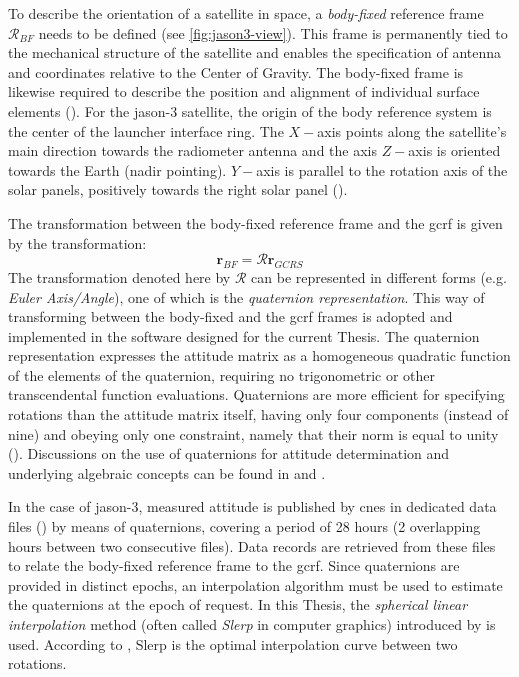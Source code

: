 To describe the orientation of a satellite in space, a \emph{body-fixed} reference 
frame $\mathcal{R}_{BF}$ needs to be defined (see \autoref{fig:jason3-view}). 
This frame is permanently tied to the mechanical 
structure of the satellite and enables the specification of antenna and coordinates 
relative to the Center of Gravity. The body-fixed frame is likewise required to describe the 
position and alignment of individual surface elements (\cite{Montenbruck2015}).
For the \gls{jason}-3 satellite, the origin of the body reference system is the center of the launcher interface ring. 
The $X-$axis points along the satellite's main direction towards the radiometer 
antenna and the axis $Z-$axis is oriented towards the Earth (nadir pointing). 
$Y-$axis is parallel to the rotation axis of the solar panels, positively 
towards the right solar panel (\cite{Zeitlhofler2019}).

The transformation between the body-fixed reference frame and the \gls{gcrf} is 
given by the transformation:
\begin{equation}
  \bm{r}_{BF} = \mathcal{R} \bm{r}_{GCRS}
\end{equation}
The transformation denoted here by $\mathcal{R}$ can be represented in different 
forms (e.g. \emph{Euler Axis/Angle}), one of which is the 
\emph{quaternion representation}. This way of transforming between the body-fixed 
and the \gls{gcrf} frames is adopted and implemented in the software designed for 
the current Thesis. The quaternion representation expresses the attitude matrix as 
a homogeneous quadratic function of the elements of the quaternion, requiring no 
trigonometric or other transcendental function evaluations. Quaternions are more 
efficient for specifying rotations than the attitude matrix itself, having only 
four components (instead of nine) and obeying only one constraint, namely that 
their norm is equal to unity (\cite{Markley2019}). Discussions on the use of 
quaternions for attitude determination and underlying algebraic concepts can be 
found in \cite{Yang2012} and \cite{Markley2019}.

In the case of \gls{jason}-3, measured attitude is published by \gls{cnes} in 
dedicated data files (\cite{Ferrage2020}) by means of quaternions, covering a 
period of 28 hours (2 overlapping hours between two consecutive files). Data records 
are retrieved from these files to relate the body-fixed reference frame to the 
\gls{gcrf}. Since quaternions are provided in distinct epochs, an interpolation 
algorithm must be used to estimate the quaternions at the epoch of request. In this 
Thesis, the \emph{spherical linear interpolation} method (often called \emph{Slerp} in 
computer graphics) introduced by \cite{Shoemake1985} is used. According to \cite{Dam2000}, 
Slerp is the optimal interpolation curve between two rotations.

